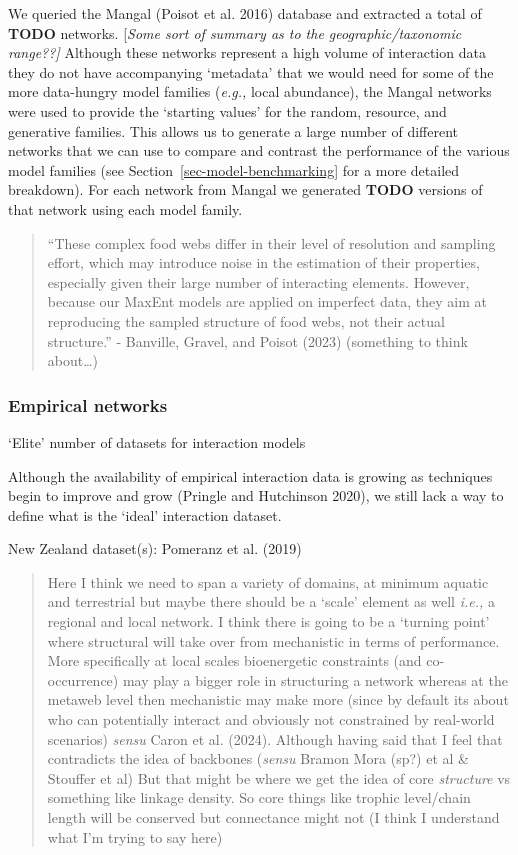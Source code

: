 \documentclass[
  letterpaper,
  DIV=11,
  numbers=noendperiod]{scrartcl}
\begin{document}
We queried the Mangal (Poisot et al. 2016) database and extracted a
total of \textbf{TODO} networks. {[}\emph{Some sort of summary as to the
geographic/taxonomic range??{]}} Although these networks represent a
high volume of interaction data they do not have accompanying `metadata'
that we would need for some of the more data-hungry model families
(\emph{e.g.,} local abundance), the Mangal networks were used to provide
the `starting values' for the random, resource, and generative families.
This allows us to generate a large number of different networks that we
can use to compare and contrast the performance of the various model
families (see Section~\ref{sec-model-benchmarking} for a more detailed
breakdown). For each network from Mangal we generated \textbf{TODO}
versions of that network using each model family.

\begin{quote}
``These complex food webs differ in their level of resolution and
sampling effort, which may introduce noise in the estimation of their
properties, especially given their large number of interacting elements.
However, because our MaxEnt models are applied on imperfect data, they
aim at reproducing the sampled structure of food webs, not their actual
structure.'' - Banville, Gravel, and Poisot (2023) (something to think
about\ldots)
\end{quote}

\subsubsection{Empirical networks}\label{empirical-networks}

`Elite' number of datasets for interaction models

Although the availability of empirical interaction data is growing as
techniques begin to improve and grow (Pringle and Hutchinson 2020), we
still lack a way to define what is the `ideal' interaction dataset.

New Zealand dataset(s): Pomeranz et al. (2019)

\begin{quote}
Here I think we need to span a variety of domains, at minimum aquatic
and terrestrial but maybe there should be a `scale' element as well
\emph{i.e.,} a regional and local network. I think there is going to be
a `turning point' where structural will take over from mechanistic in
terms of performance. More specifically at local scales bioenergetic
constraints (and co-occurrence) may play a bigger role in structuring a
network whereas at the metaweb level then mechanistic may make more
(since by default its about who can potentially interact and obviously
not constrained by real-world scenarios) \emph{sensu} Caron et al.
(2024). Although having said that I feel that contradicts the idea of
backbones (\emph{sensu} Bramon Mora (sp?) et al \& Stouffer et al) But
that might be where we get the idea of core \emph{structure} vs
something like linkage density. So core things like trophic level/chain
length will be conserved but connectance might not (I think I understand
what I'm trying to say here)
\end{quote}
\end{document}
